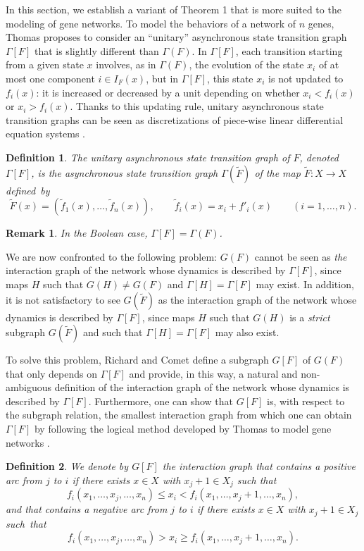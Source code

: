 \documentclass[11pt]{article}
\newtheorem{definition}{Definition}
\newtheorem{remark}{Remark}
\def\1n{1,\dots,n}
\def\F{{\tilde F}}
\def\f{\tilde f}
\begin{document}
In this section, we establish a variant of Theorem 1 that is more
suited to the modeling of gene networks. To model the behaviors of a
network of $n$ genes, Thomas {\cite{T73,TA90,TK01}} proposes to
consider an ``unitary'' asynchronous state transition graph
$\Gamma[F]$ that is slightly different than $\Gamma(F)$. In
$\Gamma[F]$, each transition starting from a given state $x$ involves,
as in $\Gamma(F)$, the evolution of the state $x_i$ of at most one
component $i\in I_F(x)$, but in $\Gamma[F]$, this state $x_i$ is not
updated to $f_i(x)$: it is increased or decreased by a unit depending
on whether $x_i<f_i(x)$ or $x_i>f_i(x)$. Thanks to this updating rule,
unitary asynchronous state transition graphs can be seen as
discretizations of piece-wise linear differential equation systems
{\cite{S89,ST93}}.

\begin{definition}
The {\emph{unitary}} asynchronous state transition graph of $F$,
denoted $\Gamma[F]$, is the asynchronous state transition graph
$\Gamma(\F)$ of the map $\F:X\to X$ defined~by
\[
\F(x)=(\f_1(x),\dots,\f_n(x)),\qquad \f_i(x)=x_i+f'_i(x)\qquad (i=\1n).
\]
\end{definition}


\begin{remark}
{\emph{In the Boolean case, $\Gamma[F]=\Gamma(F)$.}}
\end{remark}


We are now confronted to the following problem: $G(F)$ cannot be seen
as {\emph{the}} interaction graph of the network whose dynamics is
described by $\Gamma[F]$, since maps $H$ such that $G(H)\neq G(F)$ and
$\Gamma[H]=\Gamma[F]$ may exist. In addition, it is not satisfactory
to see $G(\F)$ as the interaction graph of the network whose dynamics
is described by $\Gamma[F]$, since maps $H$ such that $G(H)$ is a
{\emph{strict}} subgraph $G(\F)$ and such that $\Gamma[H]=\Gamma[F]$
may also exist.

To solve this problem, Richard and Comet {\cite{RC07}} define a
subgraph $G[F]$ of $G(F)$ that only depends on $\Gamma[F]$ and
provide, in this way, a natural and non-ambiguous definition of the
interaction graph of the network whose dynamics is described by
$\Gamma[F]$. Furthermore, one can show that $G[F]$ is, with respect to
the subgraph relation, the smallest interaction graph from which one
can obtain $\Gamma[F]$ by following the logical method developed by
Thomas to model gene networks {\cite{R06}}.

\begin{definition}
We denote by $G[F]$ the interaction graph that contains a positive arc
from $j$ to $i$ if there exists $x\in X$ with $x_j+1\in X_j$ such that
\[
f_i(x_1,\dots,x_j,\dots,x_n)\leq x_i <f_i(x_1,\dots,x_j+1,\dots,x_n),
\]
and that contains a negative arc from $j$ to $i$ if there exists $x\in X$ with
$x_j+1\in X_j$ such~that
\[
f_i(x_1,\dots,x_j,\dots,x_n)> x_i \geq f_i(x_1,\dots,x_j+1,\dots,x_n).
\]
\end{definition}
\end{document}

